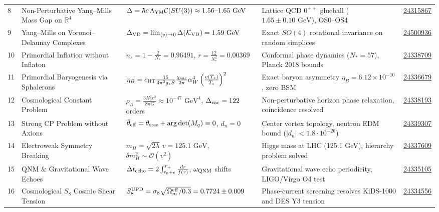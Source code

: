 \documentclass[11pt,a4paper]{article}
\theoremstyle{definition}
\begin{document}
\begin{small}
\begin{longtable}{p{} p{} p{} p{} p{}}
8 & Non-Perturbative Yang--Mills Mass Gap on $\mathbb{R}^4$ & $\Delta = \hbar c \, \Lambda_{\rm YM} \mathcal{C}(SU(3)) \approx 1.56\text{--}1.65\text{ GeV}$ & Lattice QCD $0^{++}$ glueball ($1.65 \pm 0.10\text{ GeV}$), OS0--OS4 & \href{https://doi.org/10.5281/zenodo.24315867}{24315867} \\
9 & Yang--Mills on Voronoi--Delaunay Complexes & $\Delta_{\rm VD} = \lim_{\langle v \rangle \to 0} \Delta(\mathcal{K}_{\rm VD}) = 1.59\text{ GeV}$ & Exact $SO(4)$ rotational invariance on random simplices & \href{https://doi.org/10.5281/zenodo.24500936}{24500936} \\
10 & Primordial Inflation without Inflaton & $n_s = 1 - \frac{2}{N_*} = 0.96491$, $r = \frac{12}{N_*^2} = 0.00369$ & Conformal phase dynamics ($N_* = 57$), Planck 2018 bounds & \href{https://doi.org/10.5281/zenodo.24338709}{24338709} \\
11 & Primordial Baryogenesis via Sphalerons & $\eta_B = c_{\rm HT} \frac{15}{4\pi^2 g_*S} \frac{\chi_{\rm vac}}{2\pi} \alpha_W^4 \left(\frac{v(T_*)}{T_*}\right)^2$ & Exact baryon asymmetry $\eta_B = 6.12 \times 10^{-10}$, zero BSM & \href{https://doi.org/10.5281/zenodo.24336679}{24336679} \\
12 & Cosmological Constant Problem & $\rho_\Lambda = \frac{3 H_0^2 c^2}{8\pi G} \approx 10^{-47}\text{ GeV}^4$, $\Delta_{\rm vac} = 122$ orders & Non-perturbative horizon phase relaxation, coincidence resolved & \href{https://doi.org/10.5281/zenodo.24338193}{24338193} \\
13 & Strong CP Problem without Axions & $\bar{\theta}_{\rm eff} = \theta_{\rm tree} + \arg\det(M_q) \equiv 0$, $d_n = 0$ & Center vortex topology, neutron EDM bound ($|d_n| < 1.8 \cdot 10^{-26}$) & \href{https://doi.org/10.5281/zenodo.24339307}{24339307} \\
14 & Electroweak Symmetry Breaking & $m_H = \sqrt{2\lambda}\, v = 125.1\text{ GeV}$, $\delta m_H^2 \sim \mathcal{O}(v^2)$ & Higgs mass at LHC (125.1 GeV), hierarchy problem solved & \href{https://doi.org/10.5281/zenodo.24337609}{24337609} \\
15 & QNM \& Gravitational Wave Echoes & $\Delta t_{\rm echo} = 2 \int_{r_0 + \epsilon}^{r_+} \frac{dr}{f(r)}$, $\omega_{\rm QNM}$ shifts & Gravitational wave echo periodicity, LIGO/Virgo O4 test & \href{https://doi.org/10.5281/zenodo.24335105}{24335105} \\
16 & Cosmological $S_8$ Cosmic Shear Tension & $S_8^{\rm UPD} = \sigma_8 \sqrt{\Omega_m^{\rm eff}/0.3} = 0.7724 \pm 0.009$ & Phase-current screening resolves KiDS-1000 and DES Y3 tension & \href{https://doi.org/10.5281/zenodo.24334556}{24334556} \\

\end{longtable}
\end{small}
\end{document}
